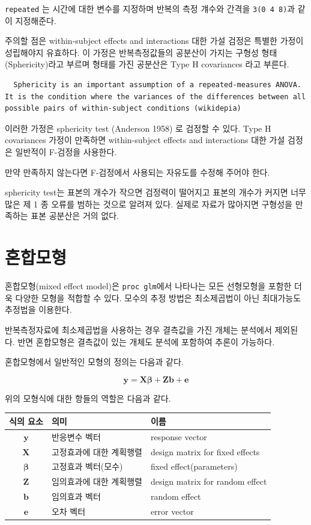 \documentclass[
]{book}
\makeatletter
\newenvironment{kframe}{%
\medskip{}
\setlength{\fboxsep}{.8em}
 \def\at@end@of@kframe{}%
 \ifinner\ifhmode%
  \def\at@end@of@kframe{\end{minipage}}%
  \begin{minipage}{\columnwidth}%
 \fi\fi%
 \def\FrameCommand##1{\hskip\@totalleftmargin \hskip-\fboxsep
 \colorbox{shadecolor}{##1}\hskip-\fboxsep
     \hskip-\linewidth \hskip-\@totalleftmargin \hskip\columnwidth}%
 \MakeFramed {\advance\hsize-\width
   \@totalleftmargin\z@ \linewidth\hsize
   \@setminipage}}%
 {\par\unskip\endMakeFramed%
 \at@end@of@kframe}
\newenvironment{rmdblock}[1]
  {
  \begin{itemize}
  \renewcommand{\labelitemi}{
    \raisebox{-.7\height}[0pt][0pt]{
      {\setkeys{Gin}{width=3em,keepaspectratio}\texttt{[image: images/\#1]}}
    }
  }
  \setlength{\fboxsep}{1em}
  \begin{kframe}
  \item
  }
  {
  \end{kframe}
  \end{itemize}
  }
\newenvironment{rmdimportant}
  {\begin{rmdblock}{important}}
  {\end{rmdblock}}
\theoremstyle{definition}
\theoremstyle{definition}
\theoremstyle{definition}
\theoremstyle{remark}
\makeatother
\begin{document}
\texttt{repeated} 는 시간에 대한 변수를 지정하며 반복의 측정 걔수와 간격을 \texttt{3(0\ 4\ 8)}과 같이 지정해준다.

주의할 점은 within-subject effects and interactions 대한 가설 검정은
특별한 가정이 성립해야지 유효하다. 이 가정은 반복측정값들의 공분산이 가지는 구형성 형태(Sphericity)라고 부르며 형태를 가진 공분산은 Type H covariances 라고 부른다.

\begin{verbatim}
  Sphericity is an important assumption of a repeated-measures ANOVA. It is the condition where the variances of the differences between all possible pairs of within-subject conditions (wikidepia)
\end{verbatim}

이러한 가정은 sphericity test (Anderson 1958) 로 검정할 수 있다. Type H covariances 가정이 만족하면 within-subject effects and interactions 대한 가설 검정은 일반적이 F-검정을 사용한다.

만약 만족하지 않는다면 F-검정에서 사용되는 자유도를 수정해 주어야 한다.

sphericity test는 표본의 개수가 작으면 검정력이 떨어지고 표본의 개수가 커지면 너무 많은 제 1 종 오류를 범하는 것으로 알려져 있다. 실제로 자료가 많아지면 구형성을 만족하는 표본 공분산은 거의 없다.

\hypertarget{mixed}{%
\chapter{혼합모형}\label{mixed}}

혼합모형(mixed effect model)은 \texttt{proc\ glm}에서 나타나는 모든 선형모형을 포함한 더욱 다양한 모형을 적합할 수 있다. 모수의 추정 방법은 최소제곱법이 아닌 최대가능도 추정법을 이용한다.

\begin{rmdimportant}
반복측정자료에 최소제곱법을 사용하는 경우 결측값을 가진 개체는 분석에서 제외된다. 반면 혼합모형은 결측값이 있는 개체도 분석에 포함하여 추론이 가능하다.
\end{rmdimportant}

혼합모형에서 일반적인 모형의 정의는 다음과 같다.

\begin{equation}
\bm y = \bm X  \bm \beta + \bm Z \bm b + \bm e 
\label{eq:mixedmodel}
\end{equation}

위의 모형식에 대한 항들의 역할은 다음과 같다.

\begin{longtable}[]{@{}cll@{}}
\toprule
식의 요소 & 의미 & 이름\tabularnewline
\midrule
\endhead
\(\bm y\) & 반응변수 벡터 & response vector\tabularnewline
\(\bm X\) & 고정효과에 대한 계획행렬 & design matrix for fixed effects\tabularnewline
\(\bm \beta\) & 고정효과 벡터(모수) & fixed effect(parameters)\tabularnewline
\(\bm Z\) & 임의효과에 대한 계획행렬 & design matrix for random effect\tabularnewline
\(\bm b\) & 임의효과 벡터 & random effect\tabularnewline
\(\bm e\) & 오차 벡터 & error vector\tabularnewline
\bottomrule
\end{longtable}
\end{document}
